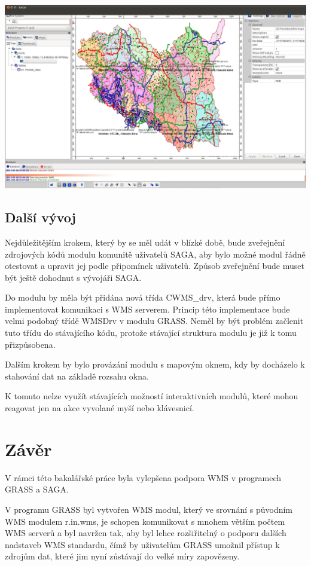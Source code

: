 \documentclass[a4paper,12pt]{article}
\begin{document}
 \includegraphics[scale=0.25]{figures/SAGA_okno4.png}
\subsection{Další vývoj}

Nejdůležitějším krokem, který by se měl udát v blízké době, bude
zveřejnění zdrojových kódů modulu komunitě uživatelů SAGA, aby bylo
možné modul řádně otestovat a upravit jej podle připomínek
uživatelů. Způsob zveřejnění bude muset být ještě dohodnut s vývojáři
SAGA.

Do modulu by měla být přidána nová třída CWMS\_drv, která bude přímo
implementovat komunikaci s WMS serverem. Princip této implementace
bude velmi podobný třídě WMSDrv v modulu GRASS. Neměl by být problém
začlenit tuto třídu do stávajícího kódu, protože stávající struktura
modulu je již k tomu přizpůsobena.

Dalším krokem by bylo provázání modulu s mapovým oknem, kdy by
docházelo k stahování dat na základě rozsahu okna.

K tomuto nelze využít stávajících možností interaktivních modulů,
které mohou reagovat jen na akce vyvolané myší nebo klávesnicí.

\newpage 
\section{Závěr}

V rámci této bakalářské práce byla vylepšena podpora WMS v programech 
GRASS a SAGA. 

V programu GRASS byl vytvořen WMS modul, který ve srovnání s
původním WMS modulem r.in.wms, je schopen komunikovat s mnohem větším
počtem WMS serverů a byl navržen tak, aby byl lehce
rozšiřitelný o podporu dalších nadstaveb WMS standardu, čímž by 
uživatelům GRASS umožnil přístup k zdrojům dat, které jim nyní zůstávají 
do velké míry zapovězeny.
\end{document}

